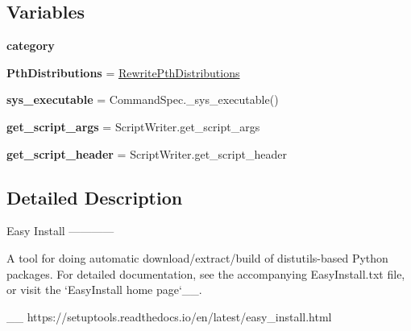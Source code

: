 \subsection*{Variables}
\begin{DoxyCompactItemize}
\item 
\mbox{\label{namespacesetuptools_1_1command_1_1easy__install_aee298a1c6afa16b18a8b1ad432b6f88a}} 
{\bfseries category}
\item 
\mbox{\label{namespacesetuptools_1_1command_1_1easy__install_a08d9dd33967b4546f8c8ab0f1d299915}} 
{\bfseries Pth\+Distributions} = \hyperlink{classsetuptools_1_1command_1_1easy__install_1_1_rewrite_pth_distributions}{Rewrite\+Pth\+Distributions}
\item 
\mbox{\label{namespacesetuptools_1_1command_1_1easy__install_a48f76612889173175965851e9c795b8a}} 
{\bfseries sys\+\_\+executable} = Command\+Spec.\+\_\+sys\+\_\+executable()
\item 
\mbox{\label{namespacesetuptools_1_1command_1_1easy__install_a267b9ab1d7874774429df54a3da6ad66}} 
{\bfseries get\+\_\+script\+\_\+args} = Script\+Writer.\+get\+\_\+script\+\_\+args
\item 
\mbox{\label{namespacesetuptools_1_1command_1_1easy__install_ab52dc3bb25810daf44071c5f8e29e1f1}} 
{\bfseries get\+\_\+script\+\_\+header} = Script\+Writer.\+get\+\_\+script\+\_\+header
\end{DoxyCompactItemize}


\subsection{Detailed Description}
\begin{DoxyVerb}Easy Install
------------

A tool for doing automatic download/extract/build of distutils-based Python
packages.  For detailed documentation, see the accompanying EasyInstall.txt
file, or visit the `EasyInstall home page`__.

__ https://setuptools.readthedocs.io/en/latest/easy_install.html\end{DoxyVerb}
 

